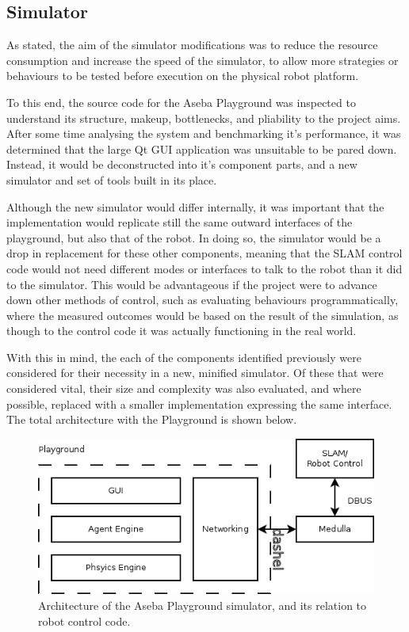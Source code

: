 \subsection{Simulator}
As stated, the aim of the simulator modifications was to reduce the resource
consumption and increase the speed of the simulator, to allow more strategies
or behaviours to be tested before execution on the physical robot platform.

To this end, the source code for the Aseba Playground was inspected to
understand its structure, makeup, bottlenecks, and pliability to the project
aims. After some time analysing the system and benchmarking it's performance,
it was determined that the large Qt GUI application was unsuitable to be pared
down. Instead, it would be deconstructed into it's component parts, and a new
simulator and set of tools built in its place.

Although the new simulator would differ internally, it was important that the
implementation would replicate still the same outward interfaces of the
playground, but also that of the robot. In doing so, the simulator would be a
drop in replacement for these other components, meaning that the SLAM control
code would not need different modes or interfaces to talk to the robot than it
did to the simulator. This would be advantageous if the project were to advance
down other methods of control, such as evaluating behaviours programmatically,
where the measured outcomes would be based on the result of the simulation, as
though to the control code it was actually functioning in the real world.

With this in mind, the each of the components identified previously were
considered for their necessity in a new, minified simulator. Of these that were
considered vital, their size and complexity was also evaluated, and where
possible, replaced with a smaller implementation expressing the same interface.
The total architecture with the Playground is shown below.
\begin{figure}[!h]
    \centering
    \includegraphics[width=\textwidth]{playground.png}
    \caption{Architecture of the Aseba Playground simulator, and its relation
    to robot control code.}
\end{figure}

